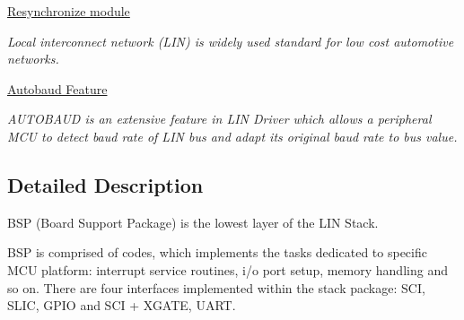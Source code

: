 \begin{DoxyCompactItemize}
\hyperlink{group__resync__group}{Resynchronize module}
\begin{DoxyCompactList}\small\item\em Local interconnect network (L\+I\+N) is widely used standard for low cost automotive networks. \end{DoxyCompactList}\item 
\hyperlink{group__autobaud__group}{Autobaud Feature}
\begin{DoxyCompactList}\small\item\em A\+U\+T\+O\+B\+A\+U\+D is an extensive feature in L\+I\+N Driver which allows a peripheral M\+C\+U to detect baud rate of L\+I\+N bus and adapt its original baud rate to bus value. \end{DoxyCompactList}\end{DoxyCompactItemize}


\subsection{Detailed Description}
B\+S\+P (Board Support Package) is the lowest layer of the L\+I\+N Stack. 

B\+S\+P is comprised of codes, which implements the tasks dedicated to specific M\+C\+U platform\+: interrupt service routines, i/o port setup, memory handling and so on. There are four interfaces implemented within the stack package\+: S\+C\+I, S\+L\+I\+C, G\+P\+I\+O and S\+C\+I + X\+G\+A\+T\+E, U\+A\+R\+T. 